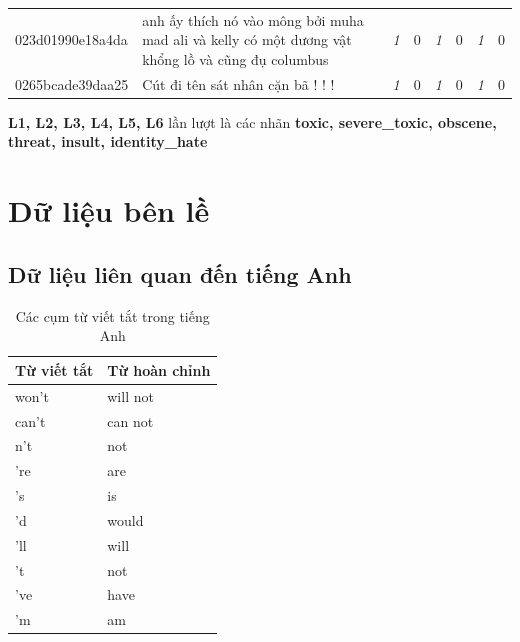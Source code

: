 \begin{table}[htb!]
{\begin{minipage}{0.88\textheight}
\begin{threeparttable}
\begin{tabularx}{\textwidth}{L{0.95} L{6.25} C{0.135} C{0.135} C{0.135} C{0.135} C{0.135} C{0.135}}
                    023d01990e18a4da & anh ấy thích nó vào mông bởi muha mad ali và kelly có một dương vật khổng lồ và cũng đụ columbus                                  & \textit{1}  & 0           & \textit{1}  & 0           & \textit{1}  & 0           \\
                    0265bcade39daa25 & Cút đi tên sát nhân cặn bã ! ! !                                                                                                  & \textit{1}  & 0           & \textit{1}  & 0           & \textit{1}  & 0           \\
                    \bottomrule
                \end{tabularx}
                \begin{tablenotes}
                    \fontsize{8pt}{12pt}\selectfont
                    \item \textbf{L1, L2, L3, L4, L5, L6} lần lượt là các nhãn \textbf{toxic, severe\_toxic, obscene, threat, insult, identity\_hate}
                \end{tablenotes}
            \end{threeparttable}
        \end{minipage}%
    }
\end{table}
\clearpage

\section*{Dữ liệu bên lề}
\subsection*{Dữ liệu liên quan đến tiếng Anh}
\begin{table}[htb]
    \centering
    \caption{Các cụm từ viết tắt trong tiếng Anh}
    \label{table:english-contractions}
    \begin{tabular}{ll}
        \toprule
        \textbf{Từ viết tắt} & \textbf{Từ hoàn chỉnh} \\\midrule
        won't                & will not               \\
        can't                & can not                \\
        n't                  & not                    \\
        're                  & are                    \\
        's                   & is                     \\
        'd                   & would                  \\
        'll                  & will                   \\
        't                   & not                    \\
        've                  & have                   \\
        'm                   & am                     \\
        \bottomrule
    \end{tabular}
\end{table}


